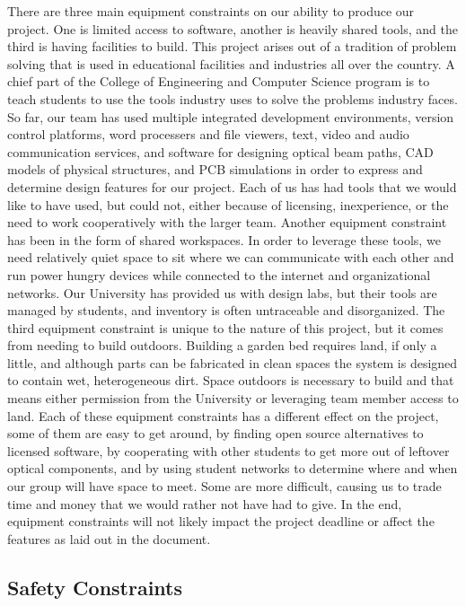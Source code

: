 There are three main equipment constraints on our ability to produce our project. One is limited access to software, another is heavily shared tools, and the third is having facilities to build.
This project arises out of a tradition of problem solving that is used in educational facilities and industries all over the country. A chief part of the College of Engineering and Computer Science program is to teach students to use the tools industry uses to solve the problems industry faces. So far, our team has used multiple integrated development environments, version control platforms, word processers and file viewers, text, video and audio communication services, and software for designing optical beam paths, CAD models of physical structures, and PCB simulations in order to express and determine design features for our project. Each of us has had tools that we would like to have used, but could not, either because of licensing, inexperience, or the need to work cooperatively with the larger team. 
Another equipment constraint has been in the form of shared workspaces. In order to leverage these tools, we need relatively quiet space to sit where we can communicate with each other and run power hungry devices while connected to the internet and organizational networks. Our University has provided us with design labs, but their tools are managed by students, and inventory is often untraceable and disorganized. 
The third equipment constraint is unique to the nature of this project, but it comes from needing to build outdoors. Building a garden bed requires land, if only a little, and although parts can be fabricated in clean spaces the system is designed to contain wet, heterogeneous dirt. Space outdoors is necessary to build and that means either permission from the University or leveraging team member access to land. 
Each of these equipment constraints has a different effect on the project, some of them are easy to get around, by finding open source alternatives to licensed software, by cooperating with other students to get more out of leftover optical components, and by using student networks to determine where and when our group will have space to meet. Some are more difficult, causing us to trade time and money that we would rather not have had to give. In the end, equipment constraints will not likely impact the project deadline or affect the features as laid out in the document.

\subsection{Safety Constraints}


